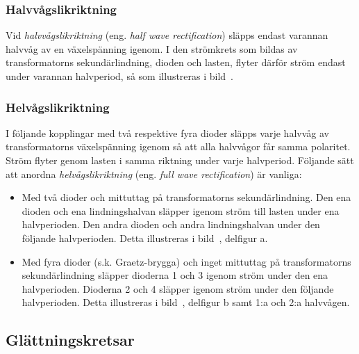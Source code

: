 
\subsubsection{Halvvågslikriktning}

Vid \emph{halvvågslikriktning} (eng. \emph{half wave rectification}) släpps
endast varannan halvvåg av en växelspänning igenom.
I den strömkrets som bildas av transformatorns sekundärlindning, dioden och
lasten, flyter därför ström endast under varannan halvperiod, så som
illustreras i bild~.

\subsubsection{Helvågslikriktning}

I följande kopplingar med två respektive fyra dioder släpps varje halvvåg av
transformatorns växelspänning igenom så att alla halvvågor får samma polaritet.
Ström flyter genom lasten i samma riktning under varje halvperiod.
Följande sätt att anordna \emph{helvågslikriktning}
(eng. \emph{full wave rectification}) är vanliga:
\begin{itemize}
\item Med två dioder och mittuttag på transformatorns sekundärlindning.
  Den ena dioden och ena lindningshalvan släpper igenom ström till lasten
  under ena halvperioden.
  Den andra dioden och andra lindningshalvan under den följande halvperioden.
  Detta illustreras i bild~, delfigur a.

\item Med fyra dioder (s.k. Graetz-brygga) och inget mittuttag på
  transformatorns sekundärlindning släpper dioderna 1 och 3 igenom
  ström under den ena halvperioden.
  Dioderna 2 och 4 släpper igenom ström under den följande halvperioden.
  Detta illustreras i bild~, delfigur b samt 1:a och 2:a
  halvvågen.
\end{itemize}

\subsection{Glättningskretsar}
\label{glättningskretsar}

